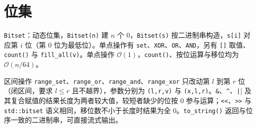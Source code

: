 \section{位集}

\verb|Bitset|：动态位集，\verb|Bitset(n)| 建 $n$ 个 $0$，\verb|Bitset(s)| 按二进制串构造，\verb|s[i]| 对应第 $i$ 位（第 $0$ 位为最低位）。单点操作有 \verb|set|、\verb|XOR|、\verb|OR|、\verb|AND|，另有 \verb|[]| 取值、\verb|count()| 与 \verb|fill_all(v)|。单点操作 $\mathcal{O}(1)$，\verb|count()|、按位运算与移位均为 $\mathcal{O}(n/64)$。

区间操作 \verb|range_set|、\verb|range_or|、\verb|range_and|、\verb|range_xor| 只改动第 $l$ 到第 $r$ 位（闭区间，要求 $l\le r$ 且不越界），参数分别为 \verb|(l,r,v)| 与 \verb|(x,l,r)|。\verb|&|、\verb|^|、\verb+|+| 及其复合赋值的结果长度为两者较大值，较短者缺少的位按 $0$ 参与运算；\verb|<<|、\verb|>>| 与 \texttt{std::bitset} 语义相同，移位数不小于长度时结果为全 $0$。\verb|to_string()| 返回与位序一致的二进制串，可直接流式输出。

